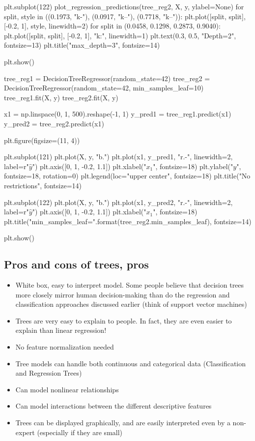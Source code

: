 \documentclass[%
oneside,                 %
final,                   %
10pt]{article}
\begin{document}
plt.subplot(122)
plot_regression_predictions(tree_reg2, X, y, ylabel=None)
for split, style in ((0.1973, "k-"), (0.0917, "k--"), (0.7718, "k--")):
    plt.plot([split, split], [-0.2, 1], style, linewidth=2)
for split in (0.0458, 0.1298, 0.2873, 0.9040):
    plt.plot([split, split], [-0.2, 1], "k:", linewidth=1)
plt.text(0.3, 0.5, "Depth=2", fontsize=13)
plt.title("max_depth=3", fontsize=14)

plt.show()
\epycod

\bpycod
tree_reg1 = DecisionTreeRegressor(random_state=42)
tree_reg2 = DecisionTreeRegressor(random_state=42, min_samples_leaf=10)
tree_reg1.fit(X, y)
tree_reg2.fit(X, y)

x1 = np.linspace(0, 1, 500).reshape(-1, 1)
y_pred1 = tree_reg1.predict(x1)
y_pred2 = tree_reg2.predict(x1)

plt.figure(figsize=(11, 4))

plt.subplot(121)
plt.plot(X, y, "b.")
plt.plot(x1, y_pred1, "r.-", linewidth=2, label=r"$\hat{y}$")
plt.axis([0, 1, -0.2, 1.1])
plt.xlabel("$x_1$", fontsize=18)
plt.ylabel("$y$", fontsize=18, rotation=0)
plt.legend(loc="upper center", fontsize=18)
plt.title("No restrictions", fontsize=14)

plt.subplot(122)
plt.plot(X, y, "b.")
plt.plot(x1, y_pred2, "r.-", linewidth=2, label=r"$\hat{y}$")
plt.axis([0, 1, -0.2, 1.1])
plt.xlabel("$x_1$", fontsize=18)
plt.title("min_samples_leaf={}".format(tree_reg2.min_samples_leaf), fontsize=14)

plt.show()
\epycod



\subsection{Pros and cons of trees, pros}

\begin{itemize}
\item White box, easy to interpret model. Some people believe that decision trees more closely mirror human decision-making than do the regression and classification approaches discussed earlier (think of support vector machines)

\item Trees are very easy to explain to people. In fact, they are even easier to explain than linear regression!

\item No feature normalization needed

\item Tree models can handle both continuous and categorical data (Classification and Regression Trees)

\item Can model nonlinear relationships

\item Can model interactions between the different descriptive features

\item Trees can be displayed graphically, and are easily interpreted even by a non-expert (especially if they are small)
\end{itemize}
\end{document}

